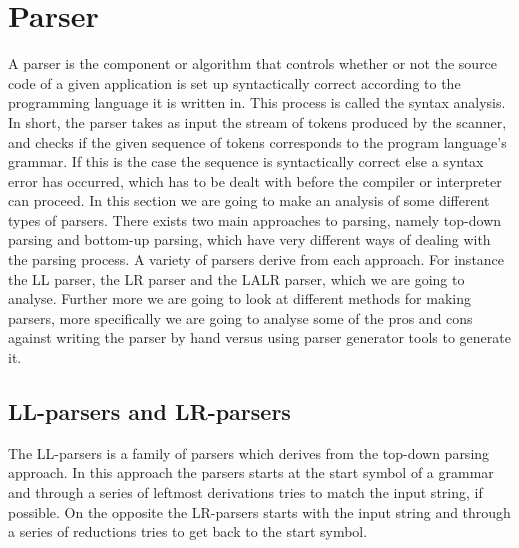 \section{Parser}
\label{sec:parser}

A parser is the component or algorithm that controls whether or not the source code of a given application is set up syntactically correct according to the programming language it is written in. This process is called the syntax analysis. In short, the parser takes as input the stream of tokens produced by the scanner, and checks if the given sequence of tokens corresponds to the program language's grammar. If this is the case the sequence is syntactically correct else a syntax error has occurred, which has to be dealt with before the compiler or interpreter can proceed. In this section we are going to make an analysis of some different types of parsers. There exists two main approaches to parsing, namely top-down parsing and bottom-up parsing, which have very different ways of dealing with the parsing process. A variety of parsers derive from each approach. For instance the LL parser, the LR parser and the LALR parser, which we are going to analyse. Further more we are going to look at different methods for making parsers, more specifically we are going to analyse some of the pros and cons against writing the parser by hand versus using parser generator tools to generate it.

\subsection{LL-parsers and LR-parsers}

The LL-parsers is a family of parsers which derives from the top-down parsing approach. In this approach the parsers starts at the start symbol of a grammar and through a series of leftmost derivations tries to match the input string, if possible. On the opposite the LR-parsers starts with the input string and through a series of reductions tries to get back to the start symbol.  

